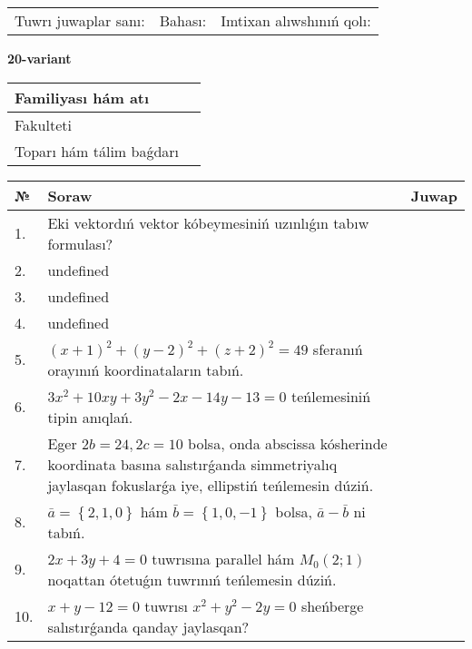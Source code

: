 \documentclass{article}
\begin{document}
\vspace{0.7cm}

\begin{tabular}{lll}
Tuwrı juwaplar sanı: \underline{\hspace{1cm}} & 
Bahası: \underline{\hspace{1cm}} & 
Imtixan alıwshınıń qolı: \underline{\hspace{2cm}} \\
\end{tabular}

\egroup

\newpage


\textbf{20-variant}\\

\bgroup
\def\arraystretch{1.6} %

\begin{tabular}{|m{5.7cm}|m{9.5cm}|}
\hline
Familiyası hám atı & \\
\hline
Fakulteti  & \\
\hline
Toparı hám tálim baǵdarı  & \\
\hline
\end{tabular}

\vspace{0.7cm}

\begin{tabular}{|m{0.7cm}|m{10cm}|m{4cm}|}
\hline
№ & Soraw & Juwap \\
\hline
1. & Eki vektordıń vektor kóbeymesiniń uzınlıǵın tabıw formulası? &  \\
\hline
2. & undefined &  \\
\hline
3. & undefined &  \\
\hline
4. & undefined &  \\
\hline
5. & \((x + 1) ^{2} + (y - 2) ^{2} + (z + 2) ^{2} = 49\) sferanıń orayınıń koordinataların tabıń. &  \\
\hline
6. & \(3 x^{2} + 10 xy + 3 y^{2} - 2 x - 14 y - 13 = 0\) teńlemesiniń tipin anıqlań. &  \\
\hline
7. & Eger \(2 b = 24, 2 c = 10\) bolsa, onda abscissa kósherinde koordinata basına salıstırǵanda simmetriyalıq jaylasqan fokuslarǵa iye, ellipstiń teńlemesin dúziń. &  \\
\hline
8. & \(\bar{a} = \left\{ 2, 1, 0 \right\}\) hám \(\bar{b} = \left\{ 1, 0,- 1 \right\}\) bolsa, \(\bar{a} - \bar{b}\) ni tabıń. &  \\
\hline
9. & \(2 x + 3 y + 4 = 0\) tuwrısına parallel hám \(M_{0} (2;1)\) noqattan ótetuǵın tuwrınıń teńlemesin dúziń. &  \\
\hline
10. & \(x + y - 12 = 0\) tuwrısı \(x^{2} + y^{2} - 2 y = 0\) sheńberge salıstırǵanda qanday jaylasqan? & \\
\hline
\end{tabular}
\end{document}
